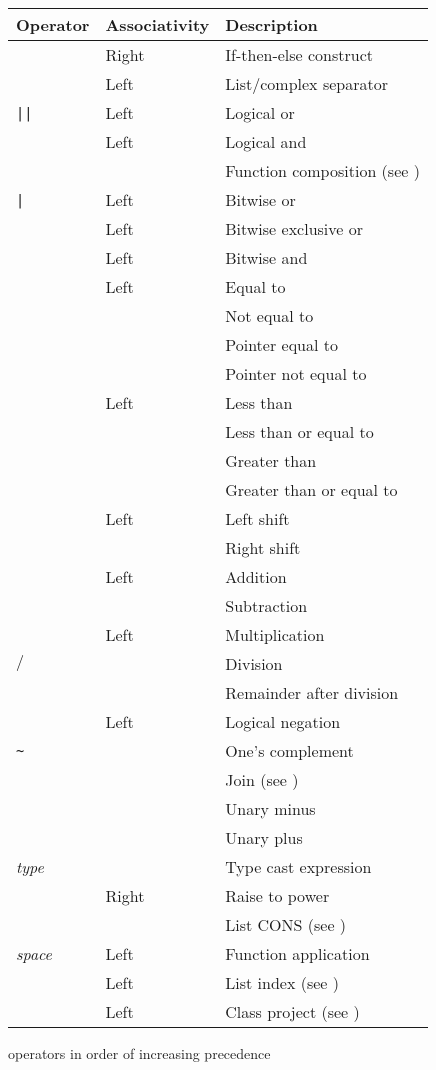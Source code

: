 \begin{tab2}
\begin{center}
\begin{tabular}{||l|l|l||}
\hline
Operator & Associativity & Description \\
\hline
\ct{if then else}	& Right			& If-then-else construct \\
\ct{,}			& Left			& List/complex separator \\
\verb+||+		& Left			& Logical or \\
\ct{\&\&}		& Left			& Logical and \\
\ct{@}			& 			& Function composition 
						  (see \pref{sec:func}) \\
\verb+|+		& Left			& Bitwise or \\
\rtp{}			& Left			& Bitwise exclusive or \\
\ct{\&}			& Left			& Bitwise and \\
\hline
\ct{==}			& Left			& Equal to\\
\ct{!=}			& 			& Not equal to\\
\ct{===}		& 			& Pointer equal to\\
\ct{!==}		& 			& Pointer not equal to\\
\hline
\ct{<}			& Left			& Less than \\
\ct{<=}			& 			& Less than or equal to\\
\ct{>}			& 			& Greater than \\
\ct{>=}			& 			& Greater than or equal to\\
\hline
\ct{<<}			& Left			& Left shift \\
\ct{>>}			& 			& Right shift \\
\hline
\ct{+}			& Left			& Addition \\
\ct{-}			& 			& Subtraction \\
\ct{*}			& Left			& Multiplication \\
$/$			& 			& Division \\
\ct{\%}			& 			& Remainder after division \\
\ct{!}			& Left			& Logical negation \\
\verb+~+		& 			& One's complement \\
\ct{++}			& 			& Join (see \pref{sec:lists}) \\
\ct{--}			& 			& Unary minus \\
\ct{+}			& 			& Unary plus \\
\ct{(}\emph{type}\ct{)}	& 			& Type cast expression \\
\ct{**}			& Right			& Raise to power \\
\ct{:}			& 			& List CONS
						  (see \pref{sec:lists}) \\
\emph{space}		& Left			& Function application \\
\ct{?}			& Left			& List index 
						  (see \pref{sec:lists}) \\
\ct{.}			& Left			& Class project 
						  (see \pref{sec:class}) \\
\hline
\end{tabular}
\end{center}
\caption{\nip{} operators in order of increasing precedence}
\end{tab2}

